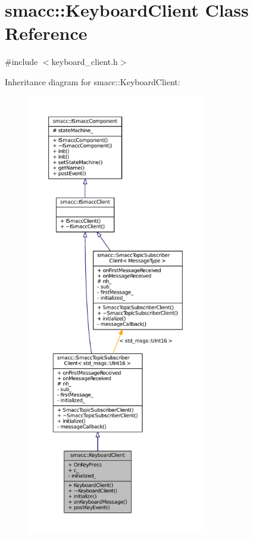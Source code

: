 \hypertarget{classsmacc_1_1KeyboardClient}{}\section{smacc\+:\+:Keyboard\+Client Class Reference}
\label{classsmacc_1_1KeyboardClient}


{\ttfamily \#include $<$keyboard\+\_\+client.\+h$>$}



Inheritance diagram for smacc\+:\+:Keyboard\+Client\+:
\nopagebreak
\begin{figure}[H]
\begin{center}
\leavevmode
\includegraphics[height=550pt]{classsmacc_1_1KeyboardClient__inherit__graph}
\end{center}
\end{figure}


